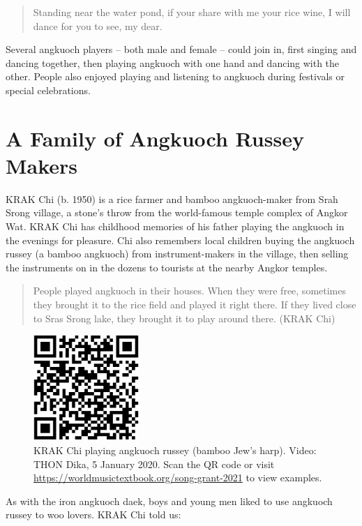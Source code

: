 \documentclass[twoside]{article}
\providecommand{\wmturl}{\href{https://worldmusictextbook.org/song-grant-2021}{https://worldmusictextbook.org/song-grant-2021}}
\providecommand{\wmturlcaption}{
  Scan the QR code or visit \wmturl{} to view examples.
}
\begin{document}
\begin{quote}
Standing near the water pond, if your share with me your rice wine, I
will dance for you to see, my dear.
\end{quote}

Several angkuoch players -- both male and female -- could join in, first
singing and dancing together, then playing angkuoch with one hand and
dancing with the other. People also enjoyed playing and listening to
angkuoch during festivals or special celebrations.

\hypertarget{a-family-of-angkuoch-russey-makers}{%
\section*{A Family of Angkuoch Russey
Makers}\label{a-family-of-angkuoch-russey-makers}}

KRAK Chi (b. 1950) is a rice farmer and bamboo angkuoch-maker from Srah
Srong village, a stone's throw from the world-famous temple complex of
Angkor Wat. KRAK Chi has childhood memories of his father playing the
angkuoch in the evenings for pleasure. Chi also remembers local children
buying the angkuoch russey (a bamboo angkuoch) from instrument-makers in
the village, then selling the instruments on in the dozens to tourists
at the nearby Angkor temples.

\begin{quote}
People played angkuoch in their houses. When they were free, sometimes
they brought it to the rice field and played it right there. If they
lived close to Sras Srong lake, they brought it to play around there.
(KRAK Chi)
\end{quote}

\begin{figure}
  \centering
  \includegraphics[height=4cm]{song-grant-video-1.png}
  \caption{KRAK Chi playing angkuoch russey (bamboo Jew's harp). Video: THON Dika, 5 January 2020. \wmturlcaption}
\end{figure}

As with the iron angkuoch daek, boys and young men liked to use angkuoch
russey to woo lovers. KRAK Chi told us:
\end{document}
